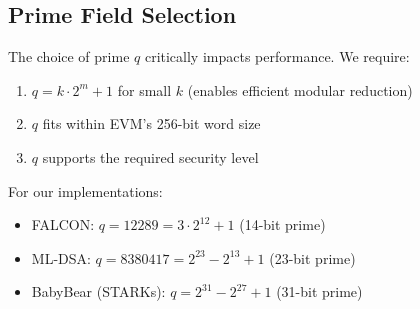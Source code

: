 \subsection{Prime Field Selection}

The choice of prime $q$ critically impacts performance. We require:
\begin{enumerate}
\item $q = k \cdot 2^m + 1$ for small $k$ (enables efficient modular reduction)
\item $q$ fits within EVM's 256-bit word size
\item $q$ supports the required security level
\end{enumerate}

For our implementations:
\begin{itemize}
\item FALCON: $q = 12289 = 3 \cdot 2^{12} + 1$ (14-bit prime)
\item ML-DSA: $q = 8380417 = 2^{23} - 2^{13} + 1$ (23-bit prime)
\item BabyBear (STARKs): $q = 2^{31} - 2^{27} + 1$ (31-bit prime)
\end{itemize}

